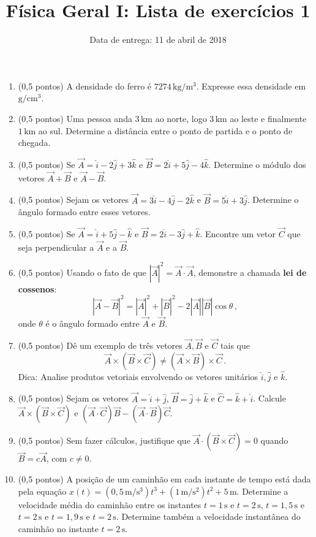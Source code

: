 \documentclass[12pt,a4paper]{article}
\title{Física Geral I: Lista de exercícios 1}
\author{Data de entrega: 11 de abril de 2018}
\date{}
\newcommand{\un}[1]{\mathrm{#1}}
\begin{document}
\maketitle
\begin{enumerate}
	\item (0,5 pontos) A densidade do ferro é $7274\,\un{kg}/\un{m}^3$. Expresse essa densidade em $\un{g}/\un{cm}^3$.
	\item (0,5 pontos) Uma pessoa anda $3\,\un{km}$ ao norte, logo $3\,\un{km}$ ao leste e finalmente $1\,\un{km}$ ao sul. Determine a distância entre o ponto de partida e o ponto de chegada.
	\item (0,5 pontos) Se $\vec A=\hat i-2\hat j+3\hat k$ e $\vec B=2\hat i+5\hat j-4\hat k$. Determine o módulo dos vetores $\vec A+\vec B$ e $\vec A-\vec B$.
	\item (0,5 pontos) Sejam os vetores $\vec A=3\hat i-4\hat j-2\hat k$ e $\vec B=5\hat i+3\hat j$. Determine o ângulo formado entre esses vetores. 
	\item (0,5 pontos) Se $\vec A=\hat i+5\hat j-\hat k$ e $\vec B=2\hat i-3\hat j+\hat k$. Encontre um vetor $\vec C$ que seja perpendicular a $\vec A$ e a $\vec B$. 
	\item (0,5 pontos) Usando o fato de que $|\vec A|^2=\vec A\cdot\vec A$, demonstre a chamada \textbf{lei de cossenos}:
	$$|\vec A-\vec B|^2=|\vec A|^2+|\vec B|^2-2|\vec A||\vec B|\cos\theta\,,$$
	onde $\theta$ é o ângulo formado entre $\vec A$ e $\vec B$.
	\item (0,5 pontos) Dê um exemplo de três vetores $\vec A, \vec B$ e $\vec C$ tais que
	$$\vec A\times (\vec B\times \vec C)\ne (\vec A\times \vec B)\times\vec C\,.$$
	Dica: Analise produtos vetoriais envolvendo os vetores unitários $\hat i,\hat j$ e $\hat k$.
	\item (0,5 pontos) Sejam os vetores $\vec A=\hat i+\hat j$, $\vec B=\hat j+\hat k$ e $\hat C=\hat k+\hat i$. Calcule $\vec A\times (\vec B\times\vec C)$ e $(\vec A\cdot\vec C)\vec B-(\vec A\cdot\vec B)\vec C$.
	\item (0,5 pontos) Sem fazer cálculos, justifique que $\vec A\cdot (\vec B\times\vec C)=0$ quando $\vec B=c\vec A$, com $c\ne 0$.
	\item (0,5 pontos) A posição de um caminhão em cada instante de tempo está dada pela equação $x(t)=(0,5 \,\un{m}/\un{s}^3)t^3+(1\,\un{m}/\un{s}^2)t^2+5\,\un{m}$. Determine a velocidade média do caminhão entre os instantes $t=1\,\un s$ e $t=2\,\un s$, $t=1,5\,\un s$ e $t=2\,\un s$ e $t=1,9\,\un s$ e $t=2\,\un s$. Determine também a velocidade instantânea do caminhão no instante $t=2\,\un s$.

\end{enumerate}
\end{document}
